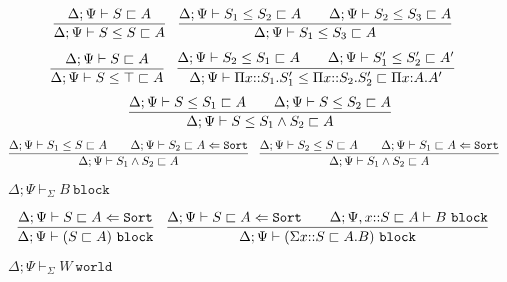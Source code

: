 \documentclass[letterpaper, 11pt]{article}
\newcommand{\Lar}{\Leftarrow}
\newcommand{\Sort}{\texttt{Sort}}
\newcommand{\block}{\texttt{block}}
\newcommand{\world}{\texttt{world}}
\begin{document}
    \begin{align*}
      & \infer{\Delta; \Psi \vdash S \leq S \sqsubset A}{\Delta; \Psi \vdash S \sqsubset A} &
      & \infer{\Delta; \Psi \vdash S_1 \leq S_3 \sqsubset A}
        {
          \Delta; \Psi \vdash S_1 \leq S_2 \sqsubset A
          &&
          \Delta; \Psi \vdash S_2 \leq S_3 \sqsubset A
        }
    \end{align*}
    \begin{align*}
      & \infer{\Delta; \Psi \vdash S \leq \top \sqsubset A}{\Delta; \Psi \vdash S \sqsubset A} &
      & \infer{\Delta; \Psi \vdash \Pi x{::}S_1. S_1' \leq \Pi x{::}S_2. S_2' \sqsubset \Pi x{:}A.A'}
        {
          \Delta; \Psi \vdash S_2 \leq S_1 \sqsubset A
          &&
          \Delta; \Psi \vdash S_1' \leq S_2' \sqsubset A'
        }
    \end{align*}
    \begin{align*}
      \infer{\Delta; \Psi \vdash S \leq S_1 \land S_2 \sqsubset A}
            { 
              \Delta; \Psi \vdash S \leq S_1 \sqsubset A
              &&
              \Delta; \Psi \vdash S \leq S_2 \sqsubset A
            }
    \end{align*}
    \begin{align*}
      & \infer{\Delta; \Psi \vdash S_1 \land S_2 \sqsubset A}
        { 
          \Delta; \Psi \vdash S_1 \leq S \sqsubset A
          &&
          \Delta; \Psi \vdash S_2 \sqsubset A \Lar \Sort
        } &
      & \infer{\Delta; \Psi \vdash S_1 \land S_2 \sqsubset A}
        { 
          \Delta; \Psi \vdash S_2 \leq S \sqsubset A
          &&
          \Delta; \Psi \vdash S_1 \sqsubset A \Lar \Sort
        }
    \end{align*}

    $\boxed{\Delta; \Psi \vdash_\Sigma B \ \block}$
    
    \begin{align*}
      & \infer{\Delta; \Psi \vdash (S \sqsubset A) \ \block}
              {
                \Delta; \Psi \vdash S \sqsubset A \Lar \Sort
              } &
      & \infer{\Delta; \Psi \vdash (\Sigma x{::}S \sqsubset A. B) \ \block}
              {
                \Delta; \Psi \vdash S \sqsubset A \Lar \Sort
                &&
                \Delta; \Psi, x{::} S \sqsubset A \vdash B \ \block
              }
    \end{align*}
    
    $\boxed{ \Delta; \Psi \vdash_\Sigma W \ \world}$
\end{document}
